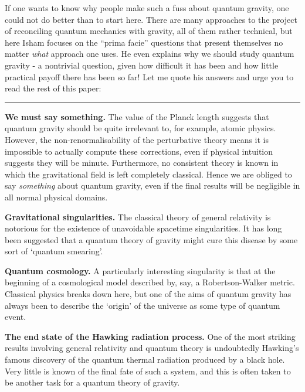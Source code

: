 \documentclass{article}
\def\tightlist{}
\renewcommand{\texttt}[1]{%
  \begingroup
  \ttfamily
  \begingroup\lccode`~=`/\lowercase{\endgroup\def~}{/\discretionary{}{}{}}%
  \begingroup\lccode`~=`[\lowercase{\endgroup\def~}{[\discretionary{}{}{}}%
  \begingroup\lccode`~=`.\lowercase{\endgroup\def~}{.\discretionary{}{}{}}%
  \catcode`/=\active\catcode`[=\active\catcode`.=\active
  \scantokens{#1\noexpand}%
  \endgroup
}
\begin{document}

If one wants to know why people make such a fuss about quantum gravity,
one could not do better than to start here. There are many approaches to
the project of reconciling quantum mechanics with gravity, all of them
rather technical, but here Isham focuses on the ``prima facie''
questions that present themselves no matter \emph{what} approach one
uses. He even explains why we should study quantum gravity - a
nontrivial question, given how difficult it has been and how little
practical payoff there has been so far! Let me quote his answers and
urge you to read the rest of this paper:

\begin{center}\rule{0.5\linewidth}{0.5pt}\end{center}

\textbf{We must say something.} The value of the Planck length suggests
that quantum gravity should be quite irrelevant to, for example, atomic
physics. However, the non-renormalisability of the perturbative theory
means it is impossible to actually compute these corrections, even if
physical intuition suggests they will be minute. Furthermore, no
consistent theory is known in which the gravitational field is left
completely classical. Hence we are obliged to say \emph{something} about
quantum gravity, even if the final results will be negligible in all
normal physical domains.

\textbf{Gravitational singularities.} The classical theory of general
relativity is notorious for the existence of unavoidable spacetime
singularities. It has long been suggested that a quantum theory of
gravity might cure this disease by some sort of `quantum smearing'.

\textbf{Quantum cosmology.} A particularly interesting singularity is
that at the beginning of a cosmological model described by, say, a
Robertson-Walker metric. Classical physics breaks down here, but one of
the aims of quantum gravity has always been to describe the `origin' of
the universe as some type of quantum event.

\textbf{The end state of the Hawking radiation process.} One of the most
striking results involving general relativity and quantum theory is
undoubtedly Hawking's famous discovery of the quantum thermal radiation
produced by a black hole. Very little is known of the final fate of such
a system, and this is often taken to be another task for a quantum
theory of gravity.
\end{document}
